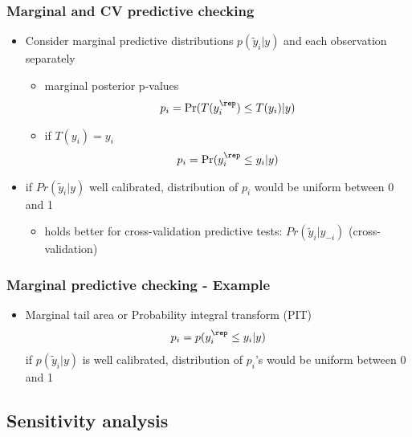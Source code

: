 \documentclass[10pt]{beamer}
\begin{document}
\begin{frame}[fragile]

\frametitle{Marginal and CV predictive checking}

  \begin{itemize}
  \item Consider marginal predictive distributions $p(\tilde{y}_i|y)$
    and each observation separately
    \begin{itemize}
    \item marginal posterior p-values
      \begin{align*}
        p_i = \mbox{Pr}(T(y_i^{\rep}) \leq T(y_i) | y)
      \end{align*}
      \pause
    \item<2-> if $T(y_i)=y_i$
      \begin{align*}
        p_i = \mbox{Pr}(y_i^{\rep} \leq y_i | y)
      \end{align*}
    \end{itemize}
  \item<2-> if $Pr(\tilde{y}_i|y)$ well calibrated, distribution of $p_i$
    would be uniform between 0 and 1
    \begin{itemize}
    \item holds better for cross-validation predictive tests: $Pr(\tilde{y}_i|y_{-i})$
      (cross-validation)
    \end{itemize}
  \end{itemize}

\end{frame}

\begin{frame}[fragile]

\frametitle{Marginal predictive checking - Example}

  \begin{itemize}
  \item Marginal tail area or Probability integral transform (PIT)
    \begin{align*}
      p_i = p(y_i^{\rep} \leq y_i | y)
    \end{align*}
  if $p(\tilde{y}_i|y)$ is well calibrated, distribution of $p_i$'s
    would be uniform between 0 and 1
  \end{itemize}
  \vspace{-1.5\baselineskip}

\end{frame}


\subsection{Sensitivity analysis}
\frame{\subsectionpage}
\end{document}
